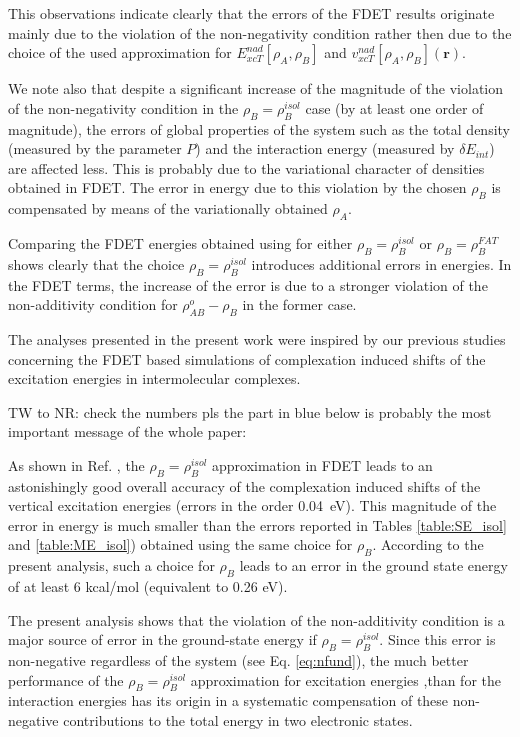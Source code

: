 \documentclass[journal=jctcce,manuscript=article]{achemso}
\begin{document}
This observations indicate clearly that  the errors of the FDET results originate mainly due to the violation of the non-negativity condition rather then due to the choice of the used approximation for ${E}_{xcT}^{nad}[\rho_A,\rho_B]$ and ${v}_{xcT}^{nad}[\rho_A,\rho_B](\mathbf{r})$.

We note also that despite a significant increase of the magnitude of the violation of the non-negativity condition in the $\rho_B=\rho_B^{isol}$ case (by at least one order of magnitude), the errors of global properties of the system such as the total density (measured by the parameter $P$) and the interaction energy (measured by $\delta E_{int}$) are affected less. This is probably due to the variational character of densities obtained in FDET.  The error in energy  due to this violation by  the chosen $\rho_B$ is compensated by means of the variationally obtained $\rho_A$.




Comparing the FDET energies obtained using for either $\rho_B=\rho_B^{isol}$ or $\rho_B=\rho_B^{FAT}$ shows clearly that the choice $\rho_B=\rho_B^{isol}$ introduces additional errors in energies. In the FDET terms, the increase of the error is due to a stronger violation of the non-additivity condition for $\rho^{o}_{AB}-\rho_B$ in the former case.


The analyses presented in the present work 
were inspired 
by our previous studies concerning the FDET based simulations of complexation induced shifts of the excitation energies in intermolecular complexes.
{\color{blue}

{\color{red} TW to NR: check the numbers pls the part in blue below is probably the most important message of the whole paper:}


As shown in Ref. , the $\rho_B=\rho_B^{isol}$ approximation in FDET leads to an astonishingly good overall accuracy of the complexation induced shifts of the vertical excitation energies (errors in the order 0.04~eV). This magnitude of the error in energy is much smaller than the errors reported in Tables \ref{table:SE_isol} and \ref{table:ME_isol}) obtained using the same choice for $\rho_B$. 
According to the present analysis, such a choice for   
$\rho_B$ leads to an error in the ground state energy of at least 6 kcal/mol (equivalent to 0.26 eV).}

The present analysis shows that the violation of the non-additivity condition is a major source of error in the ground-state energy if $\rho_B=\rho_B^{isol}$. Since this error is non-negative regardless of the system (see Eq. \ref{eq:nfund}),
the  much better performance of the $\rho_B=\rho_B^{isol}$ approximation for excitation energies \cite{Ricardi2018},than for the interaction energies has its origin in a systematic compensation of these non-negative contributions to the total energy in two electronic states. 
\end{document}
